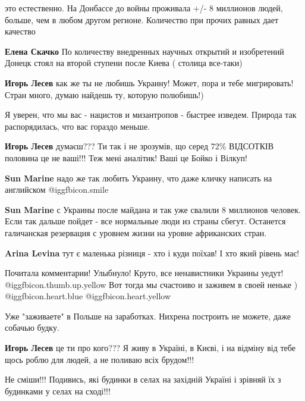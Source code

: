 \begin{itemize}
\begin{itemize} %
это естественно. На Донбассе до войны проживала +/- 8 миллионов людей, больше, чем в любом другом регионе. Количество при прочих равных дает качество

\textbf{Елена Скачко} По количеству внедренных научных открытий и изобретений Донецк стоял на второй ступени после Киева ( столица все-таки)
\end{itemize} %

\textbf{Игорь Лесев} как же ты не любишь Украину! Может, пора и тебе мигрировать! Стран много, думаю найдешь ту, которую полюбишь!)

\begin{itemize} %
Я уверен, что мы вас - нацистов и мизантропов - быстрее изведем. Природа так распорядилась, что вас гораздо меньше.

\textbf{Игорь Лесев} думаєш??? Ти так і не зрозумів, що серед 72\% ВІДСОТКІВ половина це не ваші!!! Теж мені аналітик! Ваші це Бойко і Вілкуп!

\textbf{Sun Marine} надо же так любить Украину, что даже кличку написать на английском  @igg{fbicon.smile} 

\textbf{Sun Marine} с Украины после майдана и так уже свалили 8 миллионов человек. Если так дальше пойдет - все нормальные люди из страны сбегут. Останется галичанская резервация с уровнем жизни на уровне африканских стран.

\textbf{Arina Levina} тут є маленька різниця - хто і куди поїхав! І хто який рівень має!
\end{itemize} %


Почитала комментарии! Улыбнуло! Круто, все ненавистники Украины уедут!  @igg{fbicon.thumb.up.yellow} Вот
тогда мы счастоиво и заживем в своей неньке ) @igg{fbicon.heart.blue}  @igg{fbicon.heart.yellow} 

\begin{itemize} %
Уже "заживаете" в Польше на заработках. Нихрена построить не можете, даже собачью будку.

\textbf{Игорь Лесев} це ти про кого??? Я живу в Україні, в Києві, і на відміну від тебе щось роблю для людей, а не поливаю всіх брудом!!!

Не сміши!!! Подивись, які будинки в селах на західній Україні і зрівняй їх з будинками у селах на сході!!!


\end{itemize}
\end{itemize}

